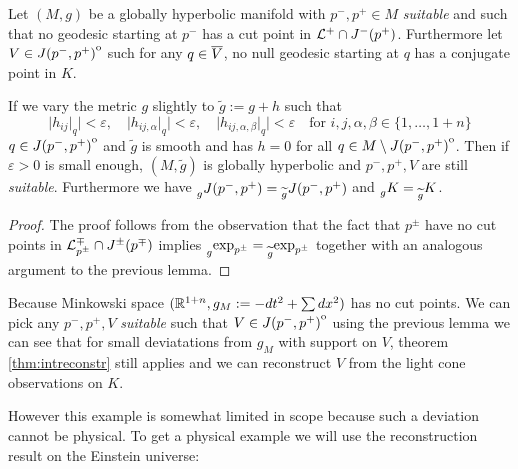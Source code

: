 \begin{corollary}\label{cor:suitablestable}
    Let $(M,g)$ be a globally hyperbolic manifold with $p^-,p^+\in M$ \emph{suitable} and such that no geodesic starting at $p^-$ has a cut point in ${\mathcal{L}}^+\cap J^-(p^+)$. Furthermore let $V\in {\kern0ptJ(p^-,p^+)}^{\mathrm{o}}$ such for any $q\in {\overline{V}}$, no null geodesic starting at $q$ has a conjugate point in $K$.
    
    If we vary the metric $g$ slightly to $\widetilde{g}:=g+h$ such that 
    \[
        \lvert h_{ij}\rvert_q \rvert <\varepsilon, \quad \lvert h_{ij,\alpha}\rvert_q \rvert <\varepsilon, \quad \lvert h_{ij,\alpha,\beta}\rvert_q \rvert <\varepsilon \quad \text{for } i,j,\alpha,\beta\in \{1,\dots, 1+n\}
    \] $q\in {\kern0ptJ(p^-,p^+)}^{\mathrm{o}}$
    and $\widetilde{g}$ is smooth and has $h=0$ for all $q\in M\setminus {\kern0ptJ(p^-,p^+)}^{\mathrm{o}}$. Then if $\varepsilon>0$ is small enough, $(M,\widetilde{g})$ is globally hyperbolic and $p^-,p^+,V$ are still \emph{suitable}. Furthermore we have $\prescript{}{g}{J(p^-,p^+)}=\prescript{}{\widetilde{g}}{J(p^-,p^+)}$ and $\prescript{}{g}{K}=\prescript{}{\widetilde{g}}{K}$.
\end{corollary}
\begin{proof}
    The proof follows from the observation that the fact that $p^\pm$ have no cut points in ${\mathcal{L}}^\mp_{p^\pm} \cap J^\pm(p^\mp)$ implies $\prescript{}{g}{\exp_{p^\pm}}= \prescript{}{\widetilde{g}}{\exp_{p^\pm}}$ together with an analogous argument to the previous lemma.
\end{proof}

\begin{example}
    Because Minkowski space $(\mathbb{R}^{1+n}, g_M:=-dt^2 + \sum dx^2)$ has no cut points. We can pick any $p^-,p^+,V$ \emph{suitable} such that $V\in {\kern0ptJ(p^-,p^+)}^{\mathrm{o}}$ using the previous lemma we can see that for small deviatations from $g_M$ with support on $V$, theorem \ref{thm:intreconstr} still applies and we can reconstruct $V$ from the light cone observations on $K$.
\end{example}



However this example is somewhat limited in scope because such a deviation cannot be physical. To get a physical example we will use the reconstruction result on the Einstein universe:

